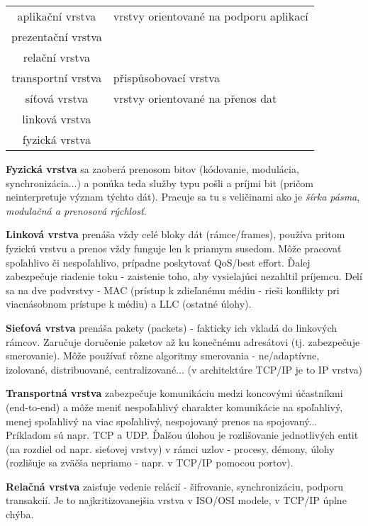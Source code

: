 \begin{center}
\begin{tabular}{|c|l|}
	\hline
	aplikační vrstva & vrstvy orientované na podporu aplikací\\
	prezentační vrstva &\\
	relační vrstva &\\
	\hline
	transportní vrstva & přispůsobovací vrstva \\
	\hline
	síťová vrstva & vrstvy orientované na přenos dat\\
	linková vrstva & \\
	fyzická vrstva & \\
	\hline
\end{tabular}
\end{center}

\textbf{Fyzická vrstva} sa zaoberá prenosom bitov (kódovanie, modulácia, synchronizácia...) a ponúka teda služby typu pošli a príjmi bit (pričom neinterpretuje význam týchto dát). Pracuje sa tu s veličinami ako je \emph{šírka pásma}, \emph{modulačná a prenosová rýchlosť}.

\textbf{Linková vrstva} prenáša vždy celé bloky dát (rámce/frames), používa pritom fyzickú vrstvu a prenos vždy funguje len k priamym susedom. Môže pracovať spoľahlivo či nespoľahlivo, prípadne poskytovať QoS/best effort. Ďalej zabezpečuje riadenie toku - zaistenie toho, aby vysielajúci nezahltil príjemcu. Delí sa na dve podvrstvy - MAC (prístup k zdieľanému médiu - rieši konflikty pri viacnásobnom prístupe k médiu) a LLC (ostatné úlohy).  

\textbf{Sieťová vrstva} prenáša pakety (packets) - fakticky ich vkladá do linkových rámcov. Zaručuje doručenie paketov až ku konečnému adresátovi (tj. zabezpečuje smerovanie). Môže používať rôzne algoritmy smerovania - ne/adaptívne, izolované, distribuované, centralizované... (v architektúre TCP/IP je to IP vrstva)

\textbf{Transportná vrstva} zabezpečuje komunikáciu medzi koncovými účastníkmi (end-to-end) a môže meniť nespoľahlivý charakter komunikácie na spoľahlivý, menej spoľahlivý na viac spoľahlivý, nespojovaný prenos na spojovaný... Príkladom sú napr. TCP a UDP. Ďalšou úlohou je rozlišovanie jednotlivých entit (na rozdiel od napr. sieťovej vrstvy) v rámci uzlov - procesy, démony, úlohy (rozlišuje sa zväčša nepriamo - napr. v TCP/IP pomocou portov).

\textbf{Relačná vrstva} zaisťuje vedenie relácií - šifrovanie, synchronizáciu, podporu transakcií. Je to najkritizovanejšia vrstva v ISO/OSI modele, v TCP/IP úplne chýba.

